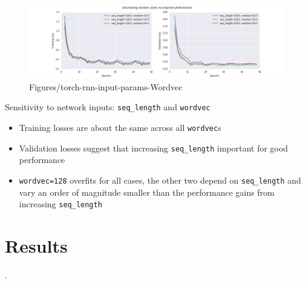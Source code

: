 \documentclass[dissertation.tex]{subfiles}
\begin{document}
\begin{figure}[htpb]
  \centering
  \includegraphics[width=1.0\linewidth]{Figures/torch-rnn-input-params-wordvec.png}
  \caption{Figures/torch-rnn-input-params-Wordvec}
  \label{fig:Figures/torch-rnn-input-params-wordvec}
\end{figure}

Sensitivity to network inputs: \texttt{seq\_length} and \texttt{wordvec}
\begin{itemize}
    \item Training losses are about the same across all \texttt{wordvec}s
    \item Validation losses suggest that increasing \texttt{seq\_length} important for
        good performance 
    \item \texttt{wordvec=128} overfits for all cases, the other two depend on
        \texttt{seq\_length} and vary an order of magnitude smaller than the
        performance gains from increasing \texttt{seq\_length}
\end{itemize}

\section{Results}

.

\printbibliography
\end{document}
